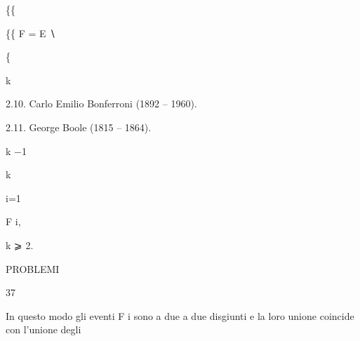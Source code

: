 \documentclass[a4paper,portrait,12pt]{article}
\begin{document}
\{\{


\begin{flushleft}
\{\{ F = E ∖
\end{flushleft}


\{


\begin{flushleft}
k
\end{flushleft}





\begin{flushleft}
2.10. Carlo Emilio Bonferroni (1892 -- 1960).
\end{flushleft}


\begin{flushleft}
2.11. George Boole (1815 -- 1864).
\end{flushleft}





\begin{flushleft}
k $-$1
\end{flushleft}





\begin{flushleft}
k
\end{flushleft}





\begin{flushleft}
i=1
\end{flushleft}





\begin{flushleft}
F i,
\end{flushleft}





\begin{flushleft}
k ⩾ 2.
\end{flushleft}





\begin{flushleft}
 PROBLEMI
\end{flushleft}





37





\begin{flushleft}
In questo modo gli eventi F i sono a due a due disgiunti e la loro unione coincide con l'unione degli
\end{flushleft}
\end{document}
